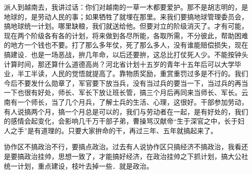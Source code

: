 派人到越南去，我讲过话：你们对越南的一草一木都要爱护。那不是胡志明的，是地球的，是劳动人民的事；如果牺牲了就埋在那里。来我们要搞地球管理委员会，搞地球统一计划。哪里缺粮，我们就送给他。但要对立的阶级消灭了。才有可能，现在两个阶级各有各的计划，将来做到各尽所能，各取所需，不分彼此，帮助困难的地方一个钱也不要。打了那么多年仗，死了那么多人，没有谁能赔偿损失，现在搞建设．也是一场恶战，拚几年命，以后还要拚，这总比打仗死人少。不能按钟头计算时间，那还算什么道德高尚？河北省计划十五岁的青年十五年后可以大学毕业，半工半读，人民的觉悟就提高了。靠物质奖励，重赏重罚过多是不行的。我们今后不要发什么勋章了，军官要下放当兵，没有当过兵的要当一下，当过兵的再当一下也很有好处，师长、军长下放让班长管，搞三个月后再同来当师长、军长。云南有一个师长，当了几个月兵，了解士兵的生活、心理，这很好。干部参加劳动，有人说搞两个月，搞一个月总是可以的，我们与劳动者在一起，是有好处的，我们的感情会起变化，会影响几千万干部子弟，曹操骂汉献帝“生于深官之中，长于妇人之手”是有道理的。只要大家拚命的干，再过三年、五年就搞起来了。

协作区不搞政治不行，要搞点政治。过去有人说协作区只搞经济不搞政治，我看还是要搞政治挂帅，思想一致了，才能搞好经济，在政治挂帅之下抓计划，搞大公社统一计划，重点建设，枝叶去掉一些．就是政治。


